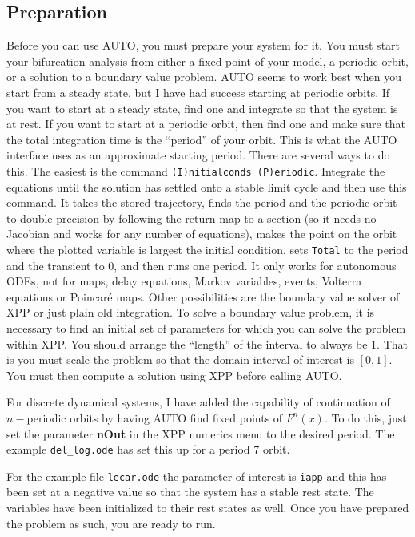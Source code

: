 \documentclass{article}
\begin{document}
\subsection{Preparation}

Before you can use AUTO, you must prepare your system for it.  You must
start your bifurcation analysis from either a  fixed point of your
model, a periodic orbit, or a solution to a boundary value problem.
  AUTO seems to work best when you start
from a steady state, but I have had success starting at periodic
orbits.  If you want to start at a steady state, find one and
integrate so that the system is at rest.  If you want to start at a
periodic orbit, then find one and make sure that the total integration
time is the ``period'' of your orbit.  This is what the AUTO interface
uses as an approximate starting period.  There are several ways to do
this.  The easiest is the command {\tt (I)nitialconds (P)eriodic}.
Integrate the equations until the solution has settled onto a stable
limit cycle and then use this command.  It takes the stored trajectory,
finds the period and the periodic orbit to double precision by following
the return map to a section (so it needs no Jacobian and works for any
number of equations), makes the point on the orbit where the plotted
variable is largest the initial condition, sets {\tt Total} to the period
and the transient to 0, and then runs one period.  It only works for
autonomous ODEs, not for maps, delay equations, Markov variables, events,
Volterra equations or Poincar\'e maps.  Other possibilities are the boundary
value solver of XPP or just
plain old integration.  To solve a boundary value
problem, it is necessary to find an initial set of parameters for
which you can solve the problem within XPP.  You should arrange the
``length'' of the interval to always be 1.  That is you must scale the
problem so that the domain interval of interest is $[0,1].$ You must
then compute a solution using XPP before calling AUTO.

For discrete dynamical systems, I have added the capability of
continuation of $n-$periodic orbits by having AUTO find fixed points
of $F^n(x).$ To do this, just set the parameter {\bf nOut} in the XPP
numerics menu to the desired period. The example {\tt del\_log.ode} has
set this up for a period 7 orbit.

For the example file {\tt lecar.ode} the parameter
of interest is {\tt iapp} and this has been set at a negative value so
that the system has a stable rest state.  The variables have been
initialized to their rest states as well.  Once you have prepared the
problem as such, you are ready to run.
\end{document}
